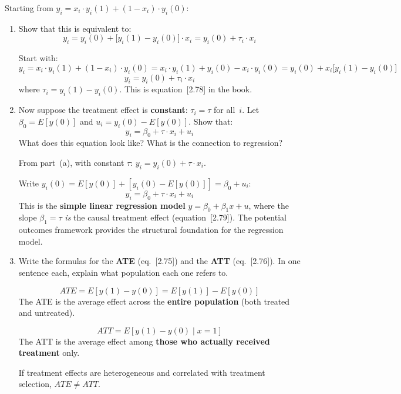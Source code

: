 \documentclass[11pt,a4paper]{article}
\begin{document}
\medskip
Starting from $y_i = x_i \cdot y_i(1) + (1 - x_i)\cdot y_i(0)$:

\begin{enumerate}[label=(\alph*)]
\item Show that this is equivalent to:
\[
  y_i = y_i(0) + \bigl[y_i(1) - y_i(0)\bigr]\cdot x_i = y_i(0) + \tau_i \cdot x_i
\]

\begin{solution}
Start with:
\[
  y_i = x_i \cdot y_i(1) + (1 - x_i)\cdot y_i(0)
  = x_i \cdot y_i(1) + y_i(0) - x_i \cdot y_i(0)
  = y_i(0) + x_i\bigl[y_i(1) - y_i(0)\bigr]
\]
\[
  \boxed{y_i = y_i(0) + \tau_i \cdot x_i}
\]
where $\tau_i = y_i(1) - y_i(0)$. This is equation~[2.78] in the book.
\end{solution}

\item Now suppose the treatment effect is \textbf{constant}: $\tau_i = \tau$ for all~$i$. Let $\beta_0 = E[y(0)]$ and $u_i = y_i(0) - E[y(0)]$. Show that:
\[
  y_i = \beta_0 + \tau \cdot x_i + u_i
\]
What does this equation look like? What is the connection to regression?

\begin{solution}
From part~(a), with constant $\tau$: $y_i = y_i(0) + \tau \cdot x_i$.

Write $y_i(0) = E[y(0)] + [y_i(0) - E[y(0)]] = \beta_0 + u_i$:
\[
  y_i = \beta_0 + \tau \cdot x_i + u_i
\]
This is the \textbf{simple linear regression model} $y = \beta_0 + \beta_1 x + u$, where the slope $\beta_1 = \tau$ \emph{is} the causal treatment effect (equation~[2.79]). The potential outcomes framework provides the structural foundation for the regression model.
\end{solution}

\item Write the formulas for the \textbf{ATE} (eq.~[2.75]) and the \textbf{ATT} (eq.~[2.76]). In one sentence each, explain what population each one refers to.

\begin{solution}
\[
  ATE = E[y(1) - y(0)] = E[y(1)] - E[y(0)]
\]
The ATE is the average effect across the \textbf{entire population} (both treated and untreated).

\[
  ATT = E[y(1) - y(0) \mid x = 1]
\]
The ATT is the average effect among \textbf{those who actually received treatment} only.

If treatment effects are heterogeneous and correlated with treatment selection, $ATE \neq ATT$.


\end{solution}
\end{enumerate}
\end{document}
